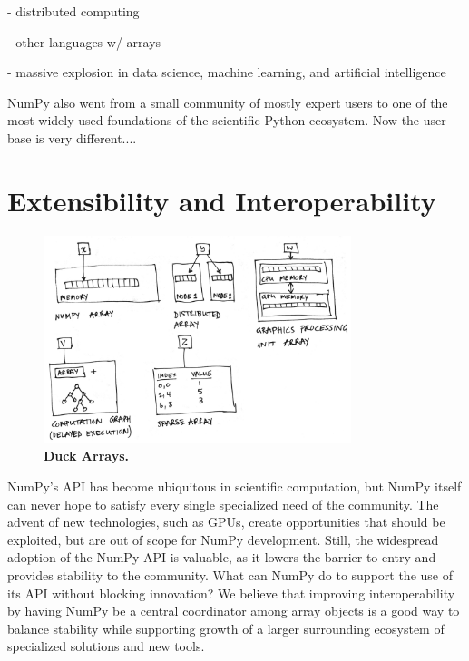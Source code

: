 - distributed computing

- other languages w/ arrays

- massive explosion in data science, machine learning, and artificial intelligence

NumPy also went from a small community of mostly expert users to
one of the most widely used foundations of the scientific Python
ecosystem.
Now the user base is very different....

\section*{Extensibility and Interoperability}

\begin{figure}
  \centering
  \includegraphics[width=0.8\textwidth]{static/sketches/duck-arrays}
  \caption{\textbf{Duck Arrays.} }
  \label{fig:duck-arrays}
\end{figure}

NumPy's API has become ubiquitous in scientific computation, but NumPy itself can never hope to satisfy every single specialized need of the community.  The advent of new technologies, such as GPUs, create opportunities that should be exploited, but are out of scope for NumPy development.  Still, the widespread adoption of the NumPy API is valuable, as it lowers the barrier to entry and provides stability to the community.  What can NumPy do to support the use of its API without blocking innovation?  We believe that improving interoperability by having NumPy be a central coordinator among array objects is a good way to balance stability while supporting growth of a larger surrounding ecosystem of specialized solutions and new tools.


